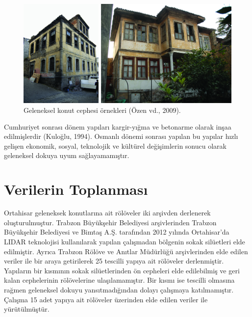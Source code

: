 \documentclass[12pt,turkish,a4paperpaper,]{report}
\begin{document}
\begin{figure}
\centering
\includegraphics[width=1\textwidth,height=\textheight]{source/figures/KonutCepheleri.jpg}
\caption{Geleneksel konut cephesi örnekleri (Özen vd., 2009).}
\end{figure}

Cumhuriyet sonrası dönem yapıları kargir-yığma ve betonarme olarak inşaa
edilmişlerdir (Kuloğlu, 1994). Osmanlı dönemi sonrası yapılan bu yapılar
hızlı gelişen ekonomik, sosyal, teknolojik ve kültürel değişimlerin
sonucu olarak geleneksel dokuya uyum sağlayamamıştır.

\hypertarget{verilerin-toplanmasux131}{%
\section{Verilerin Toplanması}\label{verilerin-toplanmasux131}}

Ortahisar geleneksek konutlarına ait rölöveler iki arşivden derlenerek
oluşturulmuştur. Trabzon Büyükşehir Belediyesi arşivlerinden Trabzon
Büyükşehir Belediyesi ve Bimtaş A.Ş. tarafından 2012 yılında
Ortahisar'da LIDAR teknolojisi kullanılarak yapılan çalışmadan bölgenin
sokak silüetleri elde edilmiştir. Ayrıca Trabzon Rölöve ve Anıtlar
Müdürlüğü arşivlerinden elde edilen veriler ile bir araya getirilerek 25
tescilli yapıya ait rölöveler derlenmiştir. Yapıların bir kısmının sokak
silüetlerinden ön cepheleri elde edilebilmiş ve geri kalan cephelerinin
rölövelerine ulaşılamamıştır. Bir kısmı ise tescilli olmasına rağmen
geleneksel dokuyu yansıtmadığından dolayı çalışmaya katılmamıştır.
Çalışma 15 adet yapıya ait rölöveler üzerinden elde edilen veriler ile
yürütülmüştür.
\end{document}
